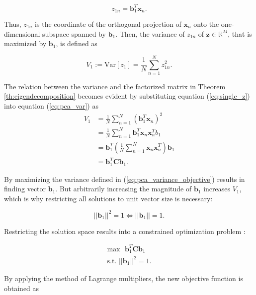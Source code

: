 \documentclass[../../../main.tex]{subfiles}
\begin{document}
\begin{equation}\label{eq:single_z}
    z_{1n} = \bm{b}_1^T\bm{x}_n.
\end{equation}

Thus, $z_{1n}$ is the coordinate of the orthogonal projection of $\bm{x}_n$ onto the one-dimensional subspace spanned by $\bm{b}_1$. Then, the variance of $z_{1n}$ of $\bm{z} \in \mathbb{R}^M$, that is maximized by $\bm{b}_1$, is defined as

\begin{equation}\label{eq:pca_var}
    V_1:= \mathrm{Var}[z_1] = \frac{1}{N}\sum_{n=1}^N z_{1n}^2.
\end{equation}

The relation between the variance and the factorized matrix in Theorem \ref{th:eigendecomposition} becomes evident by substituting equation (\ref{eq:single_z}) into equation (\ref{eq:pca_var}) as
\begin{equation}\label{eq:pca_variance_objective}
    \begin{aligned}
        V_1 &= \frac{1}{N}\sum\limits^N_{n=1}(\bm{b}_1^T\bm{x}_n)^2 \\
        &= \frac{1}{N}\sum\limits^N_{n=1} \bm{b}_1^T \bm{x}_n \bm{x}_n^T b_1 \\
        &= \bm{b}_1^T(\frac{1}{N}\sum\limits^N_{n=1} \bm{x}_n \bm{x}_n^T ) \bm{b}_1 \\
        &= \bm{b}_1^T \bm{C} \bm{b}_1.
    \end{aligned}
\end{equation}

By maximizing the variance defined in (\ref{eq:pca_variance_objective}) results in finding vector $\bm{b}_1$. But arbitrarily increasing the magnitude of $\bm{b}_1$ increases $V_1$, which is why restricting all solutions to unit vector size is necessary:

\begin{equation*}
    || \bm{b}_1 || ^2 = 1 \Leftrightarrow || \bm{b}_1 || = 1.
\end{equation*}

\newpage

Restricting the solution space results into a constrained optimization problem :

\begin{align*}
    \mathrm{max} \text{ } \bm{b}_1^T \bm{C} \bm{b}_1 \\
    \text{s.t. } || \bm{b}_1 ||^2 = 1.
\end{align*}

By applying the method of Lagrange multipliers, the new objective function is obtained as
\end{document}
